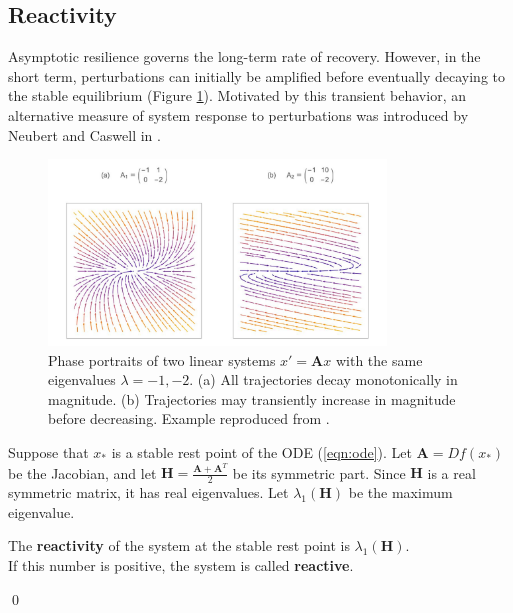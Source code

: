 \subsection{Reactivity}
Asymptotic resilience governs the long-term rate of recovery. However, in the short term, perturbations can initially be amplified before eventually decaying to the stable equilibrium (Figure \ref{fig:reactivity}). Motivated by this transient behavior, an alternative measure of system response to perturbations was introduced by Neubert and Caswell in \cite{neubertAlternativesResilienceMeasuring1997a}.

\begin{figure}[ht]
	\centering
	\captionsetup{width=0.8\linewidth}
	\includegraphics[width=0.8\textwidth]{figs/positive_reactivity_real_example}
	\caption{Phase portraits of two linear systems $x' = \textbf{A}x$ with the same eigenvalues  $\lambda = -1, -2$. (a) All trajectories decay monotonically in magnitude. (b) Trajectories may transiently increase in magnitude before decreasing. Example reproduced from \cite{neubertAlternativesResilienceMeasuring1997a}.}
	
	\label{fig:reactivity}
\end{figure} 

\begin{definition}
	Suppose that $x_\ast$ is a stable rest point of the ODE (\ref{eqn:ode}). Let $\textbf{A} = Df(x_\ast)$ be the Jacobian, and let $\textbf{H} = \frac{\textbf{A}+\textbf{A}^T}{2}$ be its symmetric part. Since $\textbf{H}$ is a real symmetric matrix, it has real eigenvalues. Let $\lambda_1(\textbf{H})$ be the maximum eigenvalue.
	
	 \begin{center}
	 	The \textbf{reactivity} of the system at the stable rest point is $\lambda_1(\mathbf{H})$.\\ If this number is positive, the system is called \textbf{reactive}.
	 \end{center}
	
	\qed
\end{definition}

